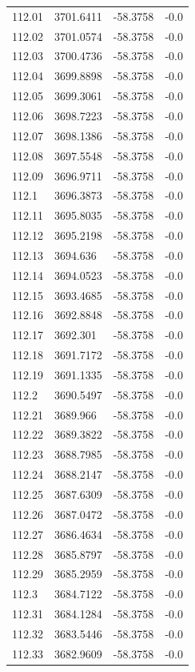 \begin{table}[H]
\begin{tabular}{llll}
112.01 & 3701.6411 & -58.3758 & -0.0 \\
112.02 & 3701.0574 & -58.3758 & -0.0 \\
112.03 & 3700.4736 & -58.3758 & -0.0 \\
112.04 & 3699.8898 & -58.3758 & -0.0 \\
112.05 & 3699.3061 & -58.3758 & -0.0 \\
112.06 & 3698.7223 & -58.3758 & -0.0 \\
112.07 & 3698.1386 & -58.3758 & -0.0 \\
112.08 & 3697.5548 & -58.3758 & -0.0 \\
112.09 & 3696.9711 & -58.3758 & -0.0 \\
112.1 & 3696.3873 & -58.3758 & -0.0 \\
112.11 & 3695.8035 & -58.3758 & -0.0 \\
112.12 & 3695.2198 & -58.3758 & -0.0 \\
112.13 & 3694.636 & -58.3758 & -0.0 \\
112.14 & 3694.0523 & -58.3758 & -0.0 \\
112.15 & 3693.4685 & -58.3758 & -0.0 \\
112.16 & 3692.8848 & -58.3758 & -0.0 \\
112.17 & 3692.301 & -58.3758 & -0.0 \\
112.18 & 3691.7172 & -58.3758 & -0.0 \\
112.19 & 3691.1335 & -58.3758 & -0.0 \\
112.2 & 3690.5497 & -58.3758 & -0.0 \\
112.21 & 3689.966 & -58.3758 & -0.0 \\
112.22 & 3689.3822 & -58.3758 & -0.0 \\
112.23 & 3688.7985 & -58.3758 & -0.0 \\
112.24 & 3688.2147 & -58.3758 & -0.0 \\
112.25 & 3687.6309 & -58.3758 & -0.0 \\
112.26 & 3687.0472 & -58.3758 & -0.0 \\
112.27 & 3686.4634 & -58.3758 & -0.0 \\
112.28 & 3685.8797 & -58.3758 & -0.0 \\
112.29 & 3685.2959 & -58.3758 & -0.0 \\
112.3 & 3684.7122 & -58.3758 & -0.0 \\
112.31 & 3684.1284 & -58.3758 & -0.0 \\
112.32 & 3683.5446 & -58.3758 & -0.0 \\
112.33 & 3682.9609 & -58.3758 & -0.0 \\

\end{tabular}
\end{table}
